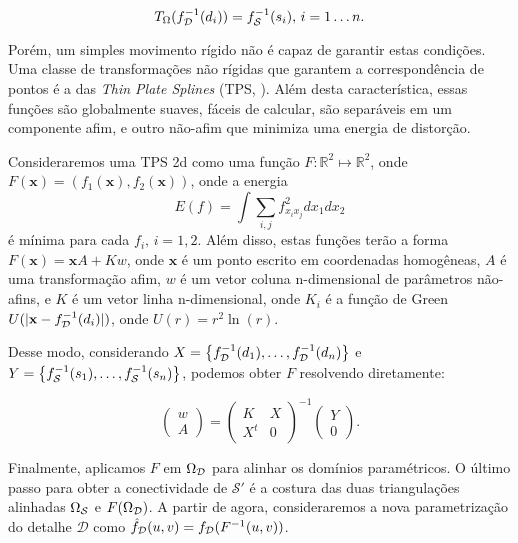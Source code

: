 \begin{equation}
T_\Omega (f_\deta^{-1}(d_i)) = f_\super^{-1}(s_i), \, i=1 \dots n.
\label{cond}
\end{equation}

Porém, um simples movimento rígido não é capaz de garantir estas condições. Uma classe de transformações não rígidas que garantem a correspondência de pontos é a das \emph{Thin Plate Splines} (TPS, \cite{Bookstein}). Além desta característica, essas funções são globalmente suaves, fáceis de calcular, são separáveis em um componente afim, e outro não-afim que minimiza uma energia de distorção.

Consideraremos uma TPS 2d como uma função $F \colon \mathbb{R}^2 \mapsto \mathbb{R}^2$, onde $F(\mathbf{x}) = (f_1(\mathbf{x}),f_2(\mathbf{x}))$, onde a energia
$$ E(f) = \int \sum_{i,j} f_{x_i x_j}^2 dx_1dx_2$$
é mínima para cada $f_i, \, i=1,2$. Além disso, estas funções terão a forma $F(\mathbf{x}) = \mathbf{x}A + Kw$, onde $\mathbf{x}$ é um ponto escrito em coordenadas homogêneas, $A$ é uma transformação afim, $w$ é um vetor coluna n-dimensional de parâmetros não-afins, e $K$ é um vetor linha n-dimensional, onde $K_i$ é a função de Green $U(|\mathbf{x}-f_{\mathcal{D}}^{-1}(d_i)|)$, onde $U(r)=r^2 \ln (r)$.

Desse modo, considerando $X = \left\{f_{\mathcal{D}}^{-1}(d_1),\dots,f_{\mathcal{D}}^{-1}(d_n) \right\}$ e $Y = \left\{f_{\mathcal{S}}^{-1}(s_1),\dots,f_{\mathcal{S}}^{-1}(s_n) \right\}$, podemos obter $F$ resolvendo diretamente:

$$ \left( \begin{array}{c}
w \\
\hline
A \end{array} \right)
=
 \left( \begin{array}{c|c}
K & X \\
\hline
X^t & 0 \end{array} \right)^{-1}
 \left( \begin{array}{c}
Y \\
\hline
0 \end{array} \right).
$$

Finalmente, aplicamos $F$ em $\Omega_{\mathcal{D}}$ para alinhar os domínios paramétricos. O último passo para obter a conectividade de $\mathcal{S}'$ é a costura das duas triangulações alinhadas $\Omega_{\mathcal{S}}$ e $F(\Omega_{\mathcal{D}})$. A partir de agora, consideraremos a nova parametrização do detalhe $\mathcal{D}$ como $\hat{f}_{\mathcal{D}}(u,v) = f_{\mathcal{D}}(F^{-1}(u,v))$. 

